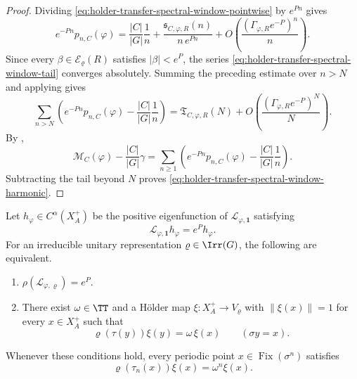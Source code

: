\begin{proof}
  Dividing \eqref{eq:holder-transfer-spectral-window-pointwise} by
  \(e^{Pn}\) gives
  \[
    e^{-Pn}p_{n,C}(\varphi)
    =
    \frac{|C|}{|G|}\frac{1}{n}
    +\frac{\mathfrak s_{C,\varphi,R}(n)}{n\,e^{Pn}}
    +O\!\left(\frac{(\Gamma_{\varphi,R}e^{-P})^n}{n}\right).
  \]
  Since every \(\beta\in\mathcal E_\varrho(R)\) satisfies
  \(|\beta|<e^P\), the series
  \eqref{eq:holder-transfer-spectral-window-tail} converges absolutely.
  Summing the preceding estimate over \(n>N\) and applying
   gives
  \[
    \sum_{n>N}
      \left(
        e^{-Pn}p_{n,C}(\varphi)
        -\frac{|C|}{|G|}\frac{1}{n}
      \right)
    =
    \mathfrak T_{C,\varphi,R}(N)
    +O\!\left(\frac{(\Gamma_{\varphi,R}e^{-P})^N}{N}\right).
  \]
  By ,
  \[
    \mathcal M_C(\varphi)-\frac{|C|}{|G|}\gamma
    =
    \sum_{n\ge 1}
      \left(
        e^{-Pn}p_{n,C}(\varphi)
        -\frac{|C|}{|G|}\frac{1}{n}
      \right).
  \]
  Subtracting the tail beyond \(N\) proves
  \eqref{eq:holder-transfer-spectral-window-harmonic}.
\end{proof}

\begin{theorem}
  \label{thm:holder-transfer-boundary-rigidity}
  Let \(h_\varphi\in C^\alpha(X_A^+)\) be the positive eigenfunction of
  \(\mathscr L_{\varphi,\mathbf 1}\) satisfying
  \[
    \mathscr L_{\varphi,\mathbf 1}h_\varphi=e^P h_\varphi.
  \]
  For an irreducible unitary representation \(\varrho\in\Irr(G)\), the
  following are equivalent.
  \begin{enumerate}[label=\textup{(\roman*)}]
    \item \(\rho(\mathscr L_{\varphi,\varrho})=e^P\).
    \item There exist \(\omega\in\TT\) and a H\"older map
      \(\xi:X_A^+\to V_\varrho\) with \(\|\xi(x)\|=1\) for every
      \(x\in X_A^+\) such that
      \begin{equation}\label{eq:holder-transfer-line-field}
        \varrho(\tau(y))\xi(y)=\omega\,\xi(x)
        \qquad (\sigma y=x).
      \end{equation}
  \end{enumerate}
  Whenever these conditions hold, every periodic point
  \(x\in\operatorname{Fix}(\sigma^n)\) satisfies
  \begin{equation}\label{eq:holder-transfer-periodic-line}
    \varrho(\tau_n(x))\xi(x)=\omega^n\xi(x).
  \end{equation}
\end{theorem}

